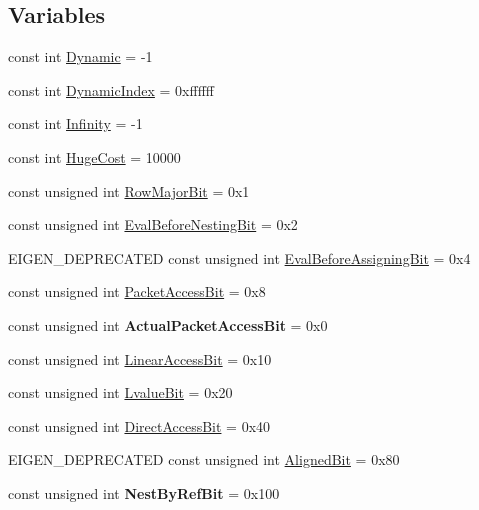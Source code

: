 \subsection*{Variables}
\begin{DoxyCompactItemize}
\item 
const int \hyperlink{namespace_eigen_ad81fa7195215a0ce30017dfac309f0b2}{Dynamic} = -\/1
\item 
const int \hyperlink{namespace_eigen_a73c597189a4a99127175e8167c456fff}{Dynamic\+Index} = 0xffffff
\item 
const int \hyperlink{namespace_eigen_a7951593b031e13d90223c83d022ce99e}{Infinity} = -\/1
\item 
const int \hyperlink{namespace_eigen_a3163430a1c13173faffde69016b48aaf}{Huge\+Cost} = 10000
\item 
const unsigned int \hyperlink{group__flags_gae4f56c2a60bbe4bd2e44c5b19cbe8762}{Row\+Major\+Bit} = 0x1
\item 
const unsigned int \hyperlink{group__flags_gaa34e83bae46a8eeae4e69ebe3aaecbed}{Eval\+Before\+Nesting\+Bit} = 0x2
\item 
E\+I\+G\+E\+N\+\_\+\+D\+E\+P\+R\+E\+C\+A\+T\+ED const unsigned int \hyperlink{group__flags_ga0972b20dc004d13984e642b3bd12532e}{Eval\+Before\+Assigning\+Bit} = 0x4
\item 
const unsigned int \hyperlink{group__flags_ga1a306a438e1ab074e8be59512e887b9f}{Packet\+Access\+Bit} = 0x8
\item 
\mbox{\label{namespace_eigen_a020f88dc24a123b9afbd756c4b220db2}} 
const unsigned int {\bfseries Actual\+Packet\+Access\+Bit} = 0x0
\item 
const unsigned int \hyperlink{group__flags_ga4b983a15d57cd55806df618ac544d09e}{Linear\+Access\+Bit} = 0x10
\item 
const unsigned int \hyperlink{group__flags_gae2c323957f20dfdc6cb8f44428eaec1a}{Lvalue\+Bit} = 0x20
\item 
const unsigned int \hyperlink{group__flags_gabf1e9d0516a933445a4c307ad8f14915}{Direct\+Access\+Bit} = 0x40
\item 
E\+I\+G\+E\+N\+\_\+\+D\+E\+P\+R\+E\+C\+A\+T\+ED const unsigned int \hyperlink{group__flags_gac5795adacd266512a26890973503ed88}{Aligned\+Bit} = 0x80
\item 
\mbox{\label{namespace_eigen_a314e8c179d85f480cbaa25558e2a649f}} 
const unsigned int {\bfseries Nest\+By\+Ref\+Bit} = 0x100

\end{DoxyCompactItemize}
